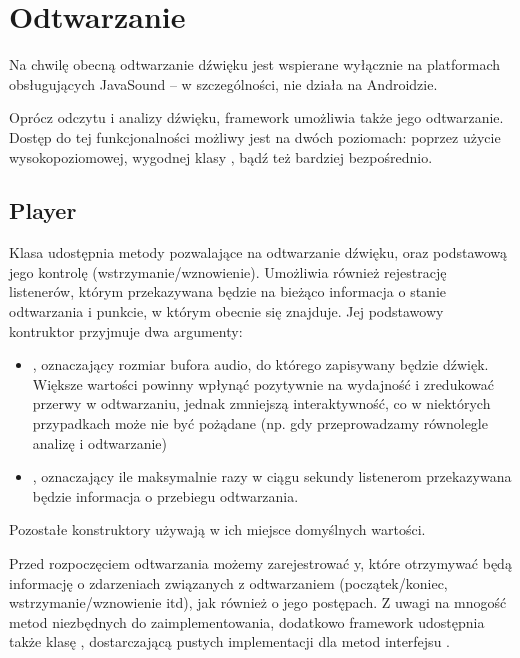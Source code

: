 \section{Odtwarzanie}

\begin{Important}
Na chwilę obecną odtwarzanie dźwięku jest wspierane wyłącznie na platformach obsługujących JavaSound
-- w szczególności, nie działa na Androidzie.
\end{Important}

Oprócz odczytu i analizy dźwięku, framework umożliwia także jego odtwarzanie. Dostęp do tej
funkcjonalności możliwy jest na dwóch poziomach: poprzez użycie wysokopoziomowej, wygodnej klasy
, bądź też bardziej bezpośrednio.

\subsection{Player}

Klasa  udostępnia metody pozwalające na odtwarzanie dźwięku, oraz podstawową jego
kontrolę (wstrzymanie/wznowienie). Umożliwia również rejestrację listenerów, którym przekazywana
będzie na bieżąco informacja o stanie odtwarzania i punkcie, w którym obecnie się znajduje. Jej
podstawowy kontruktor przyjmuje dwa argumenty:

\begin{itemize}

  \item {}, oznaczający rozmiar bufora audio, do którego zapisywany będzie dźwięk.
    Większe wartości powinny wpłynąć pozytywnie na wydajność i zredukować przerwy w odtwarzaniu,
    jednak zmniejszą interaktywność, co w niektórych przypadkach może nie być pożądane (np. gdy
    przeprowadzamy równolegle analizę i odtwarzanie)

  \item {}, oznaczający ile maksymalnie razy w ciągu sekundy listenerom przekazywana
    będzie informacja o przebiegu odtwarzania.

\end{itemize}

Pozostałe konstruktory używają w ich miejsce domyślnych wartości.

Przed rozpoczęciem odtwarzania możemy zarejestrować y, które otrzymywać będą
informację o zdarzeniach związanych z odtwarzaniem (początek/koniec, wstrzymanie/wznowienie itd),
jak również o jego postępach. Z uwagi na mnogość metod niezbędnych do zaimplementowania, dodatkowo
framework udostępnia także klasę , dostarczającą pustych implementacji dla
metod interfejsu .

